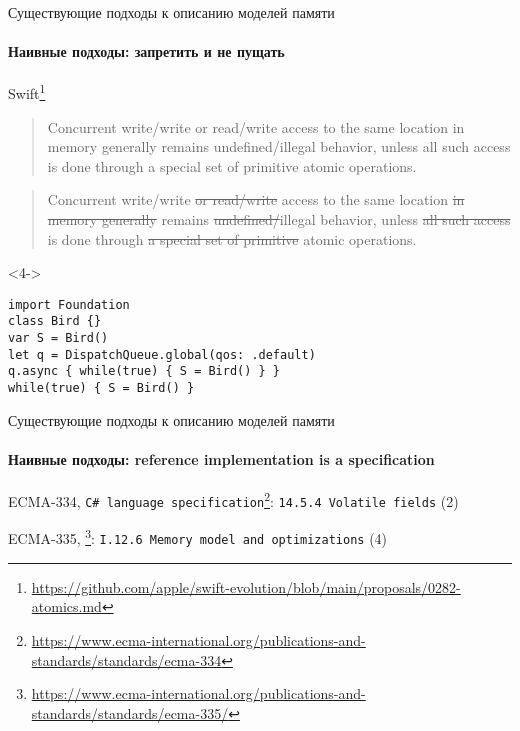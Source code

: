 \begin{frame}[fragile, t]{Существующие подходы к описанию моделей памяти}
\framesubtitle{Наивные подходы: запретить и не пущать}
Swift\footnote{\tiny\url{https://github.com/apple/swift-evolution/blob/main/proposals/0282-atomics.md}}

 {
\begin{quote}
Concurrent write/write or read/write access to the same location in memory generally remains undefined/illegal behavior, unless all such access is done through a special set of primitive atomic operations.
\end{quote}
}

 {
\begin{quote}
Concurrent write/write \sout{or read/write} access to the same location \sout{in memory generally} remains \sout{undefined/}illegal behavior, unless \sout{all such access} is done through \sout{a special set of primitive} atomic operations.
\end{quote}	
}


\begin{onlyenv}<4->
\begin{lstlisting}
import Foundation
class Bird {}
var S = Bird()
let q = DispatchQueue.global(qos: .default)
q.async { while(true) { S = Bird() } }
while(true) { S = Bird() }
\end{lstlisting}
\end{onlyenv}



\end{frame}


\begin{frame}[t]{Существующие подходы к описанию моделей памяти}
\framesubtitle{Наивные подходы: reference implementation is a specification}

{\small
ECMA-334, \texttt{C\# language specification}\footnote{\tiny\url{https://www.ecma-international.org/publications-and-standards/standards/ecma-334}}: \texttt{14.5.4 Volatile fields} (2)
}

{\small
ECMA-335, \footnote{\tiny\url{https://www.ecma-international.org/publications-and-standards/standards/ecma-335/}}: \texttt{I.12.6 Memory model and optimizations} (4)
}
\end{frame}


